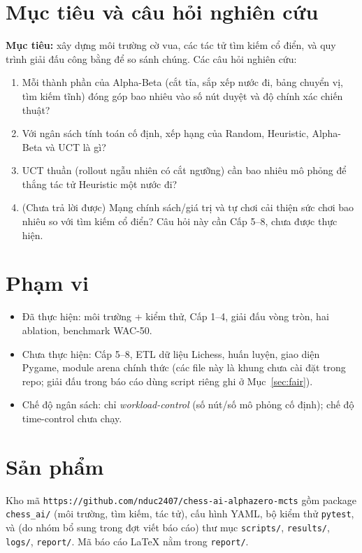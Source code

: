 \documentclass[13pt,a4paper]{extreport}
\newcommand{\RepoURL}{https://github.com/nduc2407/chess-ai-alphazero-mcts}
\newcommand{\code}[1]{\texttt{#1}}
\begin{document}
\section{Mục tiêu và câu hỏi nghiên cứu}
\textbf{Mục tiêu:} xây dựng môi trường cờ vua, các tác tử tìm kiếm cổ điển, và quy trình giải đấu công bằng để so sánh chúng. Các câu hỏi nghiên cứu:
\begin{enumerate}[label=\textbf{RQ\arabic*.},leftmargin=1.6cm]
\item Mỗi thành phần của Alpha-Beta (cắt tỉa, sắp xếp nước đi, bảng chuyển vị, tìm kiếm tĩnh) đóng góp bao nhiêu vào số nút duyệt và độ chính xác chiến thuật?
\item Với ngân sách tính toán cố định, xếp hạng của Random, Heuristic, Alpha-Beta và UCT là gì?
\item UCT thuần (rollout ngẫu nhiên có cắt ngưỡng) cần bao nhiêu mô phỏng để thắng tác tử Heuristic một nước đi?
\item (Chưa trả lời được) Mạng chính sách/giá trị và tự chơi cải thiện sức chơi bao nhiêu so với tìm kiếm cổ điển? Câu hỏi này cần Cấp 5--8, chưa được thực hiện.
\end{enumerate}

\section{Phạm vi}
\begin{itemize}
\item Đã thực hiện: môi trường + kiểm thử, Cấp 1--4, giải đấu vòng tròn, hai ablation, benchmark WAC-50.
\item Chưa thực hiện: Cấp 5--8, ETL dữ liệu Lichess, huấn luyện, giao diện Pygame, module arena chính thức (các file này là khung chưa cài đặt trong repo; giải đấu trong báo cáo dùng script riêng ghi ở Mục~\ref{sec:fair}).
\item Chế độ ngân sách: chỉ \emph{workload-control} (số nút/số mô phỏng cố định); chế độ time-control chưa chạy.
\end{itemize}

\section{Sản phẩm}
Kho mã \texttt{\RepoURL} gồm package \code{chess\_ai/} (môi trường, tìm kiếm, tác tử), cấu hình YAML, bộ kiểm thử \code{pytest}, và (do nhóm bổ sung trong đợt viết báo cáo) thư mục \code{scripts/}, \code{results/}, \code{logs/}, \code{report/}. Mã báo cáo LaTeX nằm trong \code{report/}.
\end{document}
